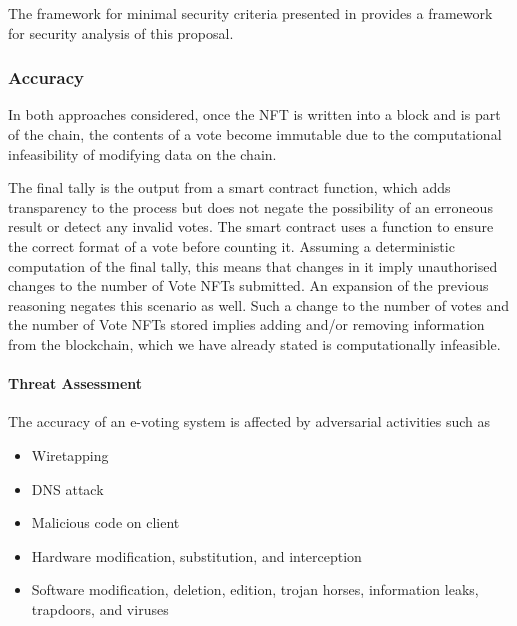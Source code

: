 \documentclass[../main.tex]{subfiles}
\begin{document}
The framework for minimal security criteria presented in \cite{Almeida2023} provides a framework for security analysis of this proposal.

\subsubsection{Accuracy}
In both approaches considered, once the NFT is written into a block and is part of the chain, the contents of a vote become immutable due to the computational infeasibility of modifying data on the chain.
\par
The final tally is the output from a smart contract function, which adds transparency to the process but does not negate the possibility of an erroneous result or detect any invalid votes. The smart contract uses a function to ensure the correct format of a vote before counting it. Assuming a deterministic computation of the final tally, this means that changes in it imply unauthorised changes to the number of Vote NFTs submitted. An expansion of the previous reasoning negates this scenario as well. Such a change to the number of votes and the number of Vote NFTs stored implies adding and/or removing information from the blockchain, which we have already stated is computationally infeasible.

\paragraph{Threat Assessment}
The accuracy of an e-voting system is affected by adversarial activities such as
\begin{itemize}

    \item{Wiretapping}

    \item{DNS attack}

    \item{Malicious code on client}

    \item{Hardware modification, substitution, and interception}

    \item{Software modification, deletion, edition, trojan horses, information leaks, trapdoors, and viruses}

\end{itemize}
\end{document}
